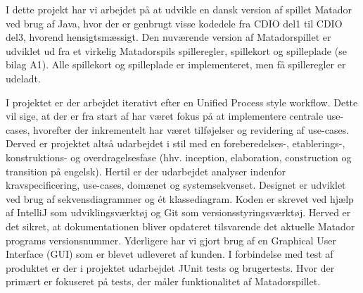 \begin{flushleft} %
\doublespacing

I dette projekt har vi arbejdet på at udvikle en dansk version af spillet Matador ved brug af Java, hvor der er genbrugt visse kodedele fra CDIO del1 til CDIO del3, hvorend hensigtsmæssigt. Den nuværende version af Matadorspillet er udviklet ud fra et virkelig Matadorspils spilleregler, spillekort og spilleplade (se bilag A1). Alle spillekort og spilleplade er implementeret, men få spilleregler er udeladt.

\addlinespace

I projektet er der arbejdet iterativt efter en Unified Process style workflow. Dette vil sige, at der er fra start af har været fokus på at implementere centrale use-cases, hvorefter der inkrementelt har været tilføjelser og revidering af use-cases. Derved er projektet altså udarbejdet i stil med en foreberedelses-, etablerings-, konstruktions- og overdragelsesfase (hhv. inception, elaboration, construction og transition på engelsk). Hertil er der udarbejdet analyser indenfor kravspecificering, use-cases, domænet og systemsekvenset. Designet er udviklet ved brug af sekvensdiagrammer og ét klassediagram.
\addlinespace
Koden er skrevet ved hjælp af IntelliJ som udviklingsværktøj og Git som versionsstyringsværktøj. Herved er det sikret, at dokumentationen bliver opdateret tilsvarende det aktuelle Matador programs versionsnummer. Yderligere har vi gjort brug af en Graphical User Interface (GUI) som er blevet udleveret af kunden.
\addlinespace
I forbindelse med test af produktet er der i projektet udarbejdet JUnit tests og brugertests. Hvor der primært er fokuseret på tests, der måler funktionalitet af Matadorspillet.
\end{flushleft}